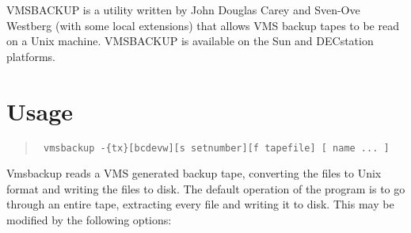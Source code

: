 VMSBACKUP is a utility written by John Douglas Carey and Sven-Ove  Westberg
(with some local extensions) that allows VMS backup tapes to be read on a Unix
machine. VMSBACKUP is available on the Sun and DECstation platforms.

\section{Usage}

\begin{quote}
{\tt
     vmsbackup -\{tx\}[bcdevw][s setnumber][f tapefile] [ name ... ]
}
\end{quote}

Vmsbackup reads a VMS generated backup tape, converting  the files  to  Unix 
format  and writing the files to disk.  The default operation of the program is
to go through an  entire tape,  extracting  every  file and writing it to disk. 
This may be modified by the following options:

